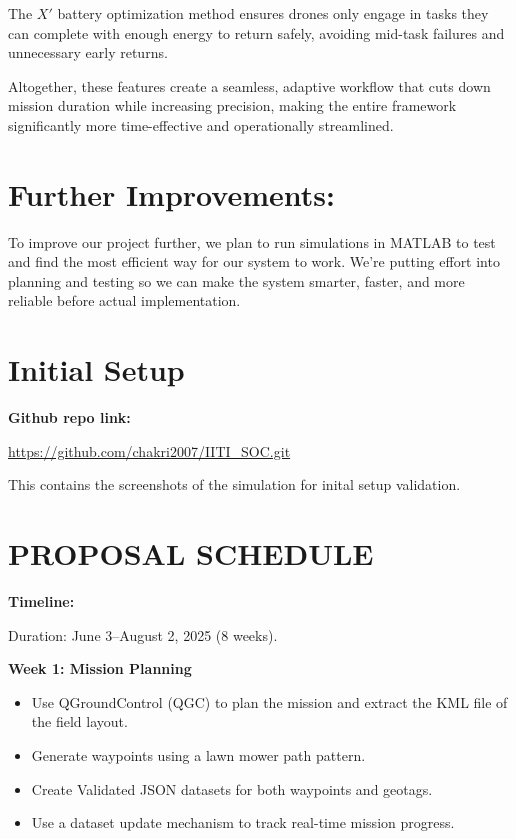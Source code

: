 \documentclass[12pt]{article}
\begin{document}
The $X'$ battery optimization method ensures drones only engage in tasks they can complete with enough energy to return safely, avoiding mid-task failures and unnecessary early returns.

Altogether, these features create a seamless, adaptive workflow that cuts down mission duration while increasing precision, making the entire framework significantly more time-effective and operationally streamlined.

\section*{Further Improvements:}
To improve our project further, we plan to run simulations in MATLAB to test and find the most efficient way for our system to work. We’re putting effort into planning and testing so we can make the system smarter, faster, and more reliable before actual implementation.

\section*{Initial Setup}
\textbf{Github repo link:} \par

\url{https://github.com/chakri2007/IITI_SOC.git}

This contains the screenshots of the simulation for inital setup validation.  \par

\section*{PROPOSAL SCHEDULE}

\textbf{Timeline:} \par

Duration: June 3--August 2, 2025 (8 weeks). \par

\textbf{Week 1: Mission Planning} \par
\begin{itemize}
    \item Use QGroundControl (QGC) to plan the mission and extract the KML file of the field layout.
    \item Generate waypoints using a lawn mower path pattern.
    \item Create Validated JSON datasets for both waypoints and geotags.
    \item Use a dataset update mechanism to track real-time mission progress.
\end{itemize}
\end{document}

